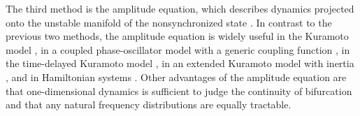 
The third method is the amplitude equation,
which describes dynamics projected onto the unstable manifold
of the nonsynchronized state \cite{crawford1994}.
In contrast to the previous two methods,
the amplitude equation is widely useful
in the Kuramoto model \cite{crawford1994},
in a coupled phase-oscillator model with a generic coupling function
\cite{crawford1995},
in the time-delayed Kuramoto model \cite{metivier-19},
in an extended Kuramoto model with inertia \cite{barre2016},
and in Hamiltonian systems
\cite{crawford1994b,crawford1995b,barre-metivier-yamaguchi-16}.
Other advantages of the amplitude equation are
that one-dimensional dynamics is sufficient
to judge the continuity of bifurcation
and that any natural frequency distributions are equally tractable.


